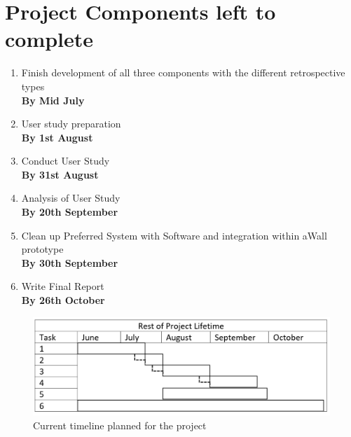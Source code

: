 \documentclass[11pt
              , a4paper
              , twoside
              , openright
              ]{report}
\begin{document}
\section{Project Components left to complete}
\begin{enumerate}
	\item Finish development of all three components with the different retrospective types \\ \textbf{By Mid July}
	\item User study preparation \\ \textbf{By 1st August}
	\item Conduct User Study \\ \textbf{By 31st August}
	\item Analysis of User Study \\ \textbf{By 20th September}
	\item Clean up Preferred System with Software and integration within aWall prototype \\ \textbf{By 30th September}
	\item Write Final Report \\ \textbf{By 26th October}  
\end{enumerate}
\begin{figure}[ht]
	\centering
	\includegraphics{timeline}
	\caption{Current timeline planned for the project}
\end{figure}



\backmatter



%


\end{document}
